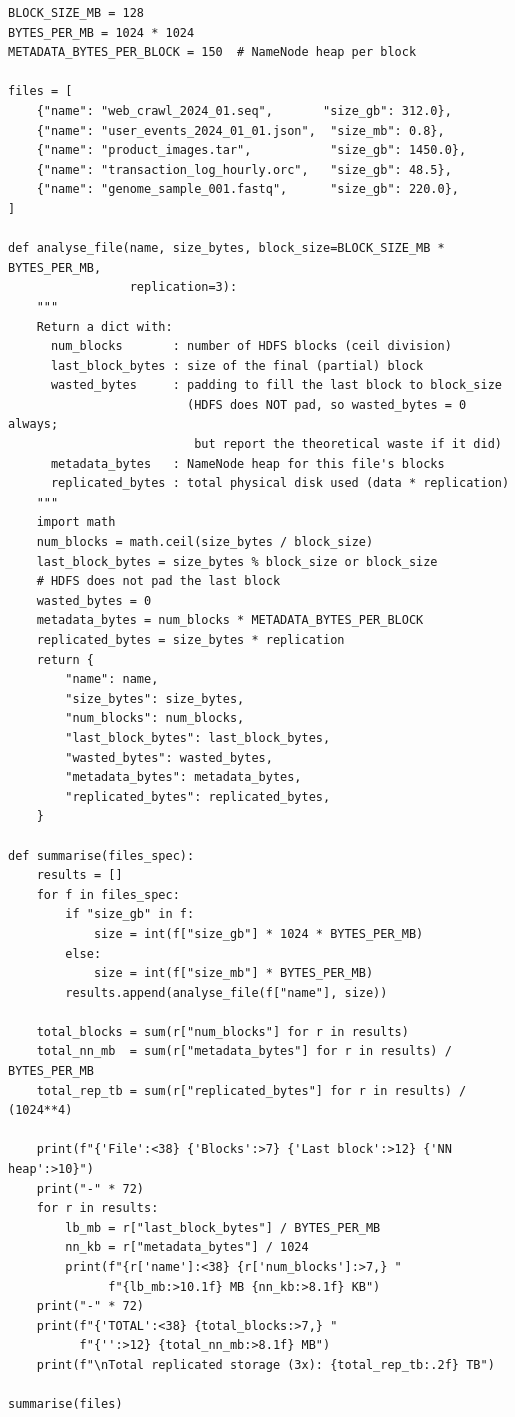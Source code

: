 \begin{lstlisting}[style=pyspark, caption={PE3.1: HDFS block layout simulator}]
BLOCK_SIZE_MB = 128
BYTES_PER_MB = 1024 * 1024
METADATA_BYTES_PER_BLOCK = 150  # NameNode heap per block

files = [
    {"name": "web_crawl_2024_01.seq",       "size_gb": 312.0},
    {"name": "user_events_2024_01_01.json",  "size_mb": 0.8},
    {"name": "product_images.tar",           "size_gb": 1450.0},
    {"name": "transaction_log_hourly.orc",   "size_gb": 48.5},
    {"name": "genome_sample_001.fastq",      "size_gb": 220.0},
]

def analyse_file(name, size_bytes, block_size=BLOCK_SIZE_MB * BYTES_PER_MB,
                 replication=3):
    """
    Return a dict with:
      num_blocks       : number of HDFS blocks (ceil division)
      last_block_bytes : size of the final (partial) block
      wasted_bytes     : padding to fill the last block to block_size
                         (HDFS does NOT pad, so wasted_bytes = 0 always;
                          but report the theoretical waste if it did)
      metadata_bytes   : NameNode heap for this file's blocks
      replicated_bytes : total physical disk used (data * replication)
    """
    import math
    num_blocks = math.ceil(size_bytes / block_size)
    last_block_bytes = size_bytes % block_size or block_size
    # HDFS does not pad the last block
    wasted_bytes = 0
    metadata_bytes = num_blocks * METADATA_BYTES_PER_BLOCK
    replicated_bytes = size_bytes * replication
    return {
        "name": name,
        "size_bytes": size_bytes,
        "num_blocks": num_blocks,
        "last_block_bytes": last_block_bytes,
        "wasted_bytes": wasted_bytes,
        "metadata_bytes": metadata_bytes,
        "replicated_bytes": replicated_bytes,
    }

def summarise(files_spec):
    results = []
    for f in files_spec:
        if "size_gb" in f:
            size = int(f["size_gb"] * 1024 * BYTES_PER_MB)
        else:
            size = int(f["size_mb"] * BYTES_PER_MB)
        results.append(analyse_file(f["name"], size))

    total_blocks = sum(r["num_blocks"] for r in results)
    total_nn_mb  = sum(r["metadata_bytes"] for r in results) / BYTES_PER_MB
    total_rep_tb = sum(r["replicated_bytes"] for r in results) / (1024**4)

    print(f"{'File':<38} {'Blocks':>7} {'Last block':>12} {'NN heap':>10}")
    print("-" * 72)
    for r in results:
        lb_mb = r["last_block_bytes"] / BYTES_PER_MB
        nn_kb = r["metadata_bytes"] / 1024
        print(f"{r['name']:<38} {r['num_blocks']:>7,} "
              f"{lb_mb:>10.1f} MB {nn_kb:>8.1f} KB")
    print("-" * 72)
    print(f"{'TOTAL':<38} {total_blocks:>7,} "
          f"{'':>12} {total_nn_mb:>8.1f} MB")
    print(f"\nTotal replicated storage (3x): {total_rep_tb:.2f} TB")

summarise(files)
\end{lstlisting}

